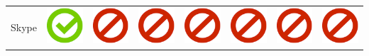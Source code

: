 \documentclass[10pt,foldmark,tumble]{leaflet}
\begin{document}
{\begin{tabular}{ L{2cm} | C{2cm} | C{2cm} | C{2cm} | C{2cm} | C{2cm} | C{2cm} | C{2cm} | }
Skype & \includegraphics[scale=0.1]{pics/haken.png} & \includegraphics[scale=0.1]{pics/nohaken.png} & \includegraphics[scale=0.1]{pics/nohaken.png} & \includegraphics[scale=0.1]{pics/nohaken.png} & \includegraphics[scale=0.1]{pics/nohaken.png} & \includegraphics[scale=0.1]{pics/nohaken.png} & \includegraphics[scale=0.1]{pics/nohaken.png} \tabularnewline

\end{tabular}}
\end{document}
